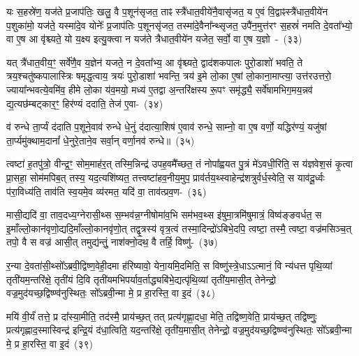 यः स॒हस्रे॑ण॒ यज॑ते प्र॒जा\-प॑तिः॒ खलु॒ वै प॒शून॑सृजत॒ ताꣴ स्त्रै॑धात॒वीये॑नै॒वासृ॑जत॒ य ए॒वं वि॒द्वाꣴस्त्रै॑धात॒वीये॑न प॒शुका॑मो॒ यज॑ते॒ यस्मा॑दे॒व योनेः᳚ प्र॒जा\-प॑तिः प॒शूनसृ॑जत॒ तस्मा॑दे॒वैना᳚न्थ्सृजत॒ उपै॑न॒मुत्त॑रꣳ स॒हस्रं॑ नमति दे॒वता᳚भ्यो॒ वा ए॒ष आ वृ॑श्च्यते॒ यो य॒क्ष्य इत्यु॒क्त्वा न यज॑ते त्रैधात॒वीये॑न यजेत॒ सर्वो॒ वा ए॒ष य॒ज्ञो~-~(३३)

यत् त्रै॑धात॒वीय॒ꣳ॒ सर्वे॑णै॒व य॒ज्ञेन॑ यजते॒ न दे॒वता᳚भ्य॒ आ वृ॑श्च्यते॒ द्वाद॑श\-कपालः पुरो॒डाशो॑ भवति॒ ते त्रय॒श्चतु॑ष्कपालास्त्रिः षमृद्ध॒त्वाय॒ त्रयः॑ पुरो॒डाशा॑ भवन्ति॒ त्रय॑ इ॒मे लो॒का ए॒षां लो॒काना॒माप्त्या॒ उत्त॑रउत्तरो॒ ज्याया᳚न्भवत्ये॒वमि॑व॒ हीमे लो॒का य॑व॒मयो॒ मध्य॑ ए॒तद्वा अ॒न्त\-रि॑क्षस्य रू॒पꣳ समृ॑द्ध्यै॒ सर्वे॑षामभिग॒मय॒न्नव॑ द्य॒त्यछ॑म्बट्कार॒ꣳ॒ हिर॑ण्यं ददाति॒ तेज॑ ए॒वा-~(३४)

व॑ रुन्धे ता॒र्प्यं द॑दाति प॒शूने॒वाव॑ रुन्धे धे॒नुं द॑दात्या॒शिष॑ ए॒वाव॑ रुन्धे॒ साम्नो॒ वा ए॒ष वर्णो॒ यद्धिर॑ण्यं॒ यजु॑षां ता॒र्प्यमु॑क्थाम॒दानां᳚ धे॒नुरे॒ताने॒व सर्वा॒न् वर्णा॒नव॑ रुन्धे॥~(३५)

{\anuvakamend[{जग॑त्या\-ऽभि॒चर॒न्थ्सर्वो॒ वै ग॑च्छति य॒ज्ञस्तेज॑ ए॒व त्रि॒ꣳ॒शच्च॑}]}%

त्वष्टा॑ ह॒तपु॑त्रो॒ वीन्द्र॒ꣳ॒ सोम॒माह॑र॒त् तस्मि॒न्निन्द्र॑ उपह॒वमै᳚च्छत॒ तं नोपा᳚ह्वयत पु॒त्रं मे॑\-ऽवधी॒रिति॒ स य॑ज्ञवेश॒सं कृ॒त्वा प्रा॒सहा॒ सोम॑मपिब॒त् तस्य॒ यद॒त्यशि॑ष्यत॒ तत्त्वष्टा॑हव॒नीय॒मुप॒ प्राव॑र्तय॒थ्\-स्वाहेन्द्र॑शत्रुर्वर्ध॒स्वेति॒ स याव॑दू॒र्ध्वः प॑रा॒विध्य॑ति॒ ताव॑ति स्व॒यमे॒व व्य॑रमत॒ यदि॑ वा॒ ताव॑त्प्रव॒ण-~(३६)

मासी॒द्यदि॑ वा॒ ताव॒दध्य॒ग्नेरासी॒थ्स स॒म्भव॑न्न॒ग्नी\-षोमा॑व॒भि सम॑भव॒थ्स इ॑षुमा॒त्रमि॑षुमात्रं॒ विष्व॑ङ्ङवर्धत॒ स इ॒माँल्लो॒कान॑वृणो॒द्य\-दि॒माँल्लो॒कान\-वृ॑णो॒त् तद्वृ॒त्रस्य॑ वृत्र॒त्वं तस्मा॒दिन्द्रो॑\-ऽबिभे॒दपि॒ त्वष्टा॒ तस्मै॒ त्वष्टा॒ वज्र॑मसिञ्च॒त् तपो॒ वै स वज्र॑ आसी॒त् तमुद्य॑न्तुं॒ नाश॑क्नो॒दथ॒ वै तर्\mbox{}हि॒ विष्णु॑-~(३७)

र॒न्या दे॒वता॑सी॒थ्सो᳚\-ऽब्रवी॒द्विष्ण॒वेही॒दमा ह॑रिष्यावो॒ येना॒यमि॒दमिति॒ स विष्णु॑स्त्रे॒धा\-ऽऽ\-त्मानं॒ वि न्य॑धत्त पृथि॒व्यां तृती॑यम॒न्तरि॑क्षे॒ तृती॑यं दि॒वि तृती॑यमभिपर्याव॒र्ताद्ध्यबि॑भे॒द्यत्पृ॑थि॒व्यां तृती॑य॒मासी॒त् तेनेन्द्रो॒ वज्र॒मुद॑यच्छ॒द्विष्ण्व॑नुस्थितः॒ सो᳚\-ऽब्रवी॒न्मा मे॒ प्र हा॒रस्ति॒ वा इ॒दं~(३८)

मयि॑ वी॒र्यं॑ तत्ते॒ प्र दा᳚स्या॒मीति॒ तद॑स्मै॒ प्राय॑च्छ॒त् तत् प्रत्य॑\-गृह्णा॒दधा॒ मेति॒ तद्विष्ण॒वेति॒ प्राय॑च्छ॒त् तद्विष्णुः॒ प्रत्य॑\-गृह्णाद॒स्मास्विन्द्र॑ इन्द्रि॒यं द॑धा॒त्विति॒ यद॒न्तरि॑क्षे॒ तृती॑य॒मासी॒त् तेनेन्द्रो॒ वज्र॒मुद॑यच्छ॒द्विष्ण्व॑नुस्थितः॒ सो᳚\-ऽब्रवी॒न्मा मे॒ प्र हा॒रस्ति॒ वा इ॒दं~(३९)

